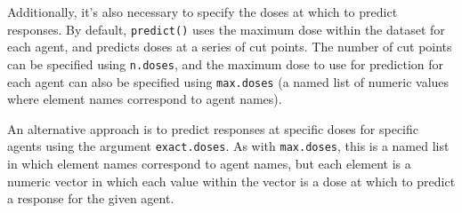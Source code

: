 \documentclass[]{article}
\newenvironment{Shaded}{\begin{snugshade}}{\end{snugshade}}
\newcommand{\CommentTok}[1]{\textcolor[rgb]{0.56,0.35,0.01}{\textit{#1}}}
\newcommand{\DataTypeTok}[1]{\textcolor[rgb]{0.13,0.29,0.53}{#1}}
\newcommand{\DecValTok}[1]{\textcolor[rgb]{0.00,0.00,0.81}{#1}}
\newcommand{\KeywordTok}[1]{\textcolor[rgb]{0.13,0.29,0.53}{\textbf{#1}}}
\newcommand{\NormalTok}[1]{#1}
\newcommand{\OperatorTok}[1]{\textcolor[rgb]{0.81,0.36,0.00}{\textbf{#1}}}
\newcommand{\StringTok}[1]{\textcolor[rgb]{0.31,0.60,0.02}{#1}}
\begin{document}
Additionally, it's also necessary to specify the doses at which to
predict responses. By default, \texttt{predict()} uses the maximum dose
within the dataset for each agent, and predicts doses at a series of cut
points. The number of cut points can be specified using
\texttt{n.doses}, and the maximum dose to use for prediction for each
agent can also be specified using \texttt{max.doses} (a named list of
numeric values where element names correspond to agent names).

An alternative approach is to predict responses at specific doses for
specific agents using the argument \texttt{exact.doses}. As with
\texttt{max.doses}, this is a named list in which element names
correspond to agent names, but each element is a numeric vector in which
each value within the vector is a dose at which to predict a response
for the given agent.

\begin{Shaded}
\end{Shaded}
\end{document}
